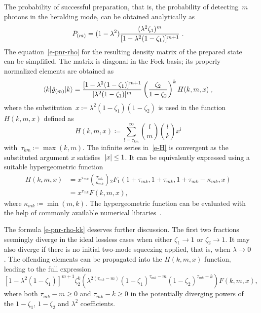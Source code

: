 \documentclass{article}
\begin{document}
The probability of successful preparation, that is, the probability of detecting~$m$ photons in the heralding mode, can be obtained analytically as
%
\begin{equation}\label{e-pnr-pro}
  P_{(m)} = (1 - \lambda^{2}) 
  \frac
    { (\lambda^{2} \zeta_{1})^{m} }
    { [ 1 - \lambda^{2} (1 - \zeta_{1}) ]^{m + 1} } \;\text{.}
\end{equation}
%
The equation~\eqref{e-pnr-rho} for the resulting density matrix of the prepared state can be simplified. The matrix is diagonal in the Fock basis; its properly normalized elements are obtained as
%
\begin{equation}\label{e-pnr-rho-kk}
  \braket{ k | \hat{\varrho}_{(m)} | k } =
  \frac
    { [ 1 - \lambda^{2} (1 - \zeta_{1}) ]^{m + 1} }
    { [ \lambda^{2} (1 - \zeta_{1}) ]^{m} }
  \left( \frac{ \zeta_{2} }{ 1 - \zeta_{2} } \right)^{k}
  H (k, m, x) \;\text{,}
\end{equation}
%
where the substitution~${x \coloneqq \lambda^{2} ( 1 - \zeta_{1} )(1 - \zeta_{2} )}$ is used in the function~$H(k, m, x)$ defined as
%
\begin{equation}\label{e-H}
  H(k, m, x) \coloneq
  \sum\limits_{l = \tau_{km}}^{\infty}
    \binom{l}{m}
    \binom{l}{k}
    x^{l} 
\end{equation}
%
with~${\tau_{km} \coloneqq \max(k, m)}$. The infinite series in~\eqref{e-H} is convergent as the substituted argument $x$ satisfies~${\lvert x \rvert \leq 1}$. It can be equivalently expressed using a suitable hypergeometric function~\cite{bateman1981}
%
\begin{equation}
  \begin{aligned}
    H(k, m, x) & =
    x^{\tau_{mk}} 
    \binom
      {\tau_{mk}}
      {\kappa_{mk}}
    {}_{2}F_{1} (
      1 + \tau_{mk},
      1 + \tau_{mk},
      1 + \tau_{mk} - \kappa_{mk},
      x
    ) \\
    & =
    x^{\tau_{mk}} F(k, m, x),
  \end{aligned}
\end{equation}
%
where ${\kappa_{mk} \coloneqq \min (m, k)}$. The hypergeometric function can be evaluated with the help of commonly available numerical libraries~\cite{virtanen2020}. 

The formula \eqref{e-pnr-rho-kk} deserves further discussion. The first two fractions seemingly diverge in the ideal lossless cases when either ${\zeta_{1} \to 1}$ or ${\zeta_{2} \to 1}$. It may also diverge if there is no initial two-mode squeezing applied, that is, when ${\lambda \to 0}$. The offending elements can be propagated into the $H(k, m, x)$ function, leading to the full expression
%
\begin{equation}
  { [ 1 - \lambda^{2} (1 - \zeta_{1}) ]^{m + 1} }
  { \zeta_{2}^{k} }
  \left(
    \lambda^{2 (\tau_{mk} - m)}
    (1 - \zeta_{1})^{\tau_{mk} - m}
    (1 - \zeta_{2})^{\tau_{mk} - k}
  \right)
  F (k, m, x),
\end{equation}
%
where both ${\tau_{mk} - m \geq 0}$ and ${\tau_{mk} - k \geq 0}$ in the potentially diverging powers of the ${1 - \zeta_{1}}$, ${1 - \zeta_{2}}$ and $\lambda^{2}$ coefficients.
\end{document}
